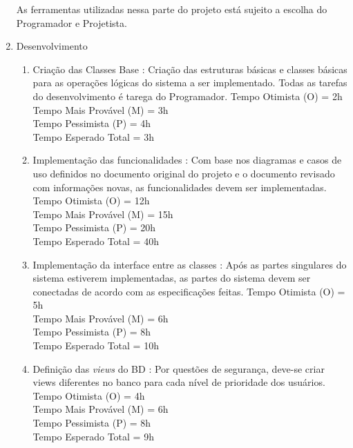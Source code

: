 \documentclass[12pt,a4paper,final]{report}
\begin{document}
\begin{enumerate}
As ferramentas utilizadas nessa parte do projeto está sujeito a escolha do Programador e Projetista.

\item Desenvolvimento
\begin{enumerate}

\item Criação das Classes Base : Criação das estruturas básicas e classes básicas para as operações lógicas do sistema a ser implementado. Todas as tarefas do desenvolvimento é tarega do Programador.
Tempo Otimista (O) = 2h\\
Tempo Mais Provável (M) = 3h\\
Tempo Pessimista (P) = 4h\\
Tempo Esperado Total = 3h

\item Implementação das funcionalidades : Com base nos diagramas e casos de uso definidos no documento original do projeto e o documento revisado com informações novas, as funcionalidades devem ser implementadas.
Tempo Otimista (O) = 12h\\
Tempo Mais Provável (M) = 15h\\
Tempo Pessimista (P) = 20h\\
Tempo Esperado Total = 40h

\item Implementação da interface entre as classes : Após as partes singulares do sistema estiverem implementadas, as partes do sistema devem ser conectadas de acordo com as especificações feitas.
Tempo Otimista (O) = 5h\\
Tempo Mais Provável (M) = 6h\\
Tempo Pessimista (P) = 8h\\
Tempo Esperado Total = 10h

\item Definição das \textit{views} do BD : Por questões de segurança, deve-se criar views diferentes no banco para cada nível de prioridade dos usuários.
Tempo Otimista (O) = 4h\\
Tempo Mais Provável (M) = 6h\\
Tempo Pessimista (P) = 8h\\
Tempo Esperado Total = 9h
\end{enumerate}


\end{enumerate}
\end{document}
